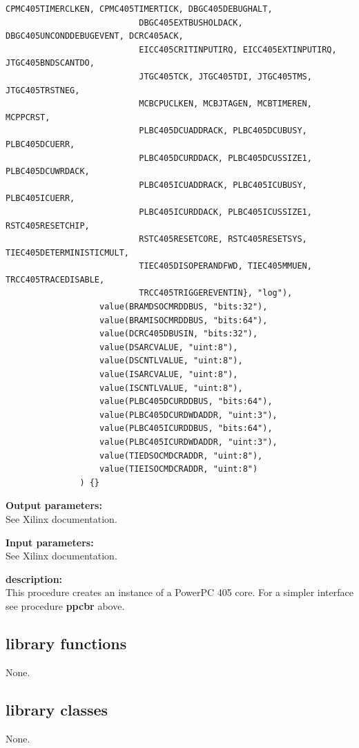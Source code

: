 \begin{lstlisting}[gobble=12, language=threepl]
                           CPMC405TIMERCLKEN, CPMC405TIMERTICK, DBGC405DEBUGHALT,
                           DBGC405EXTBUSHOLDACK, DBGC405UNCONDDEBUGEVENT, DCRC405ACK, 
                           EICC405CRITINPUTIRQ, EICC405EXTINPUTIRQ, JTGC405BNDSCANTDO,
                           JTGC405TCK, JTGC405TDI, JTGC405TMS, JTGC405TRSTNEG,
                           MCBCPUCLKEN, MCBJTAGEN, MCBTIMEREN, MCPPCRST,
                           PLBC405DCUADDRACK, PLBC405DCUBUSY, PLBC405DCUERR, 
                           PLBC405DCURDDACK, PLBC405DCUSSIZE1, PLBC405DCUWRDACK,
                           PLBC405ICUADDRACK, PLBC405ICUBUSY, PLBC405ICUERR, 
                           PLBC405ICURDDACK, PLBC405ICUSSIZE1, RSTC405RESETCHIP, 
                           RSTC405RESETCORE, RSTC405RESETSYS, TIEC405DETERMINISTICMULT,
                           TIEC405DISOPERANDFWD, TIEC405MMUEN, TRCC405TRACEDISABLE,
                           TRCC405TRIGGEREVENTIN}, "log"),
                   value(BRAMDSOCMRDDBUS, "bits:32"),
                   value(BRAMISOCMRDDBUS, "bits:64"),
                   value(DCRC405DBUSIN, "bits:32"),
                   value(DSARCVALUE, "uint:8"),
                   value(DSCNTLVALUE, "uint:8"),
                   value(ISARCVALUE, "uint:8"),
                   value(ISCNTLVALUE, "uint:8"),
                   value(PLBC405DCURDDBUS, "bits:64"),
                   value(PLBC405DCURDWDADDR, "uint:3"),
                   value(PLBC405ICURDDBUS, "bits:64"),
                   value(PLBC405ICURDWDADDR, "uint:3"),
                   value(TIEDSOCMDCRADDR, "uint:8"),
                   value(TIEISOCMDCRADDR, "uint:8")
               ) {}
            \end{lstlisting}

            {\bf Output parameters:} \\
            See Xilinx documentation.

            {\bf Input parameters:} \\
            See Xilinx documentation.

            {\bf description:} \\
            This procedure creates an instance of a PowerPC 405 core.
            For a simpler interface see procedure {\bf ppcbr} 
            above.






    \subsection{library functions}
    
    None.




    \subsection{library classes}
    
        None.
